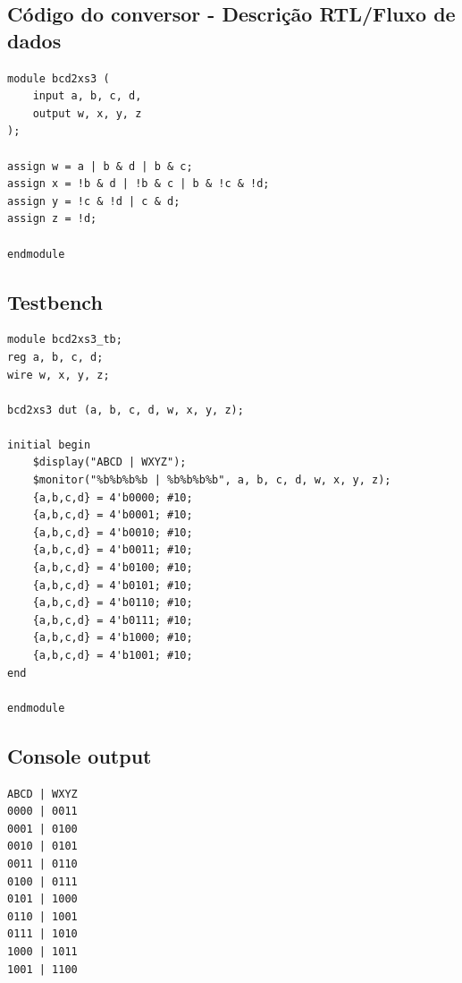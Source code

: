 \documentclass{article}
\begin{document}
\subsection{Código do conversor - Descrição RTL/Fluxo de dados}
\begin{verbatim}
module bcd2xs3 (
    input a, b, c, d,
    output w, x, y, z
);

assign w = a | b & d | b & c;
assign x = !b & d | !b & c | b & !c & !d;
assign y = !c & !d | c & d;
assign z = !d;

endmodule
\end{verbatim}

\subsection{Testbench}
\begin{verbatim}
module bcd2xs3_tb;
reg a, b, c, d;
wire w, x, y, z;

bcd2xs3 dut (a, b, c, d, w, x, y, z);

initial begin
    $display("ABCD | WXYZ");
    $monitor("%b%b%b%b | %b%b%b%b", a, b, c, d, w, x, y, z);
    {a,b,c,d} = 4'b0000; #10;
    {a,b,c,d} = 4'b0001; #10;
    {a,b,c,d} = 4'b0010; #10;
    {a,b,c,d} = 4'b0011; #10;
    {a,b,c,d} = 4'b0100; #10;
    {a,b,c,d} = 4'b0101; #10;
    {a,b,c,d} = 4'b0110; #10;
    {a,b,c,d} = 4'b0111; #10;
    {a,b,c,d} = 4'b1000; #10;
    {a,b,c,d} = 4'b1001; #10;
end

endmodule
\end{verbatim}

\subsection{Console output}
\begin{verbatim}
ABCD | WXYZ
0000 | 0011
0001 | 0100
0010 | 0101
0011 | 0110
0100 | 0111
0101 | 1000
0110 | 1001
0111 | 1010
1000 | 1011
1001 | 1100
\end{verbatim}
\end{document}
